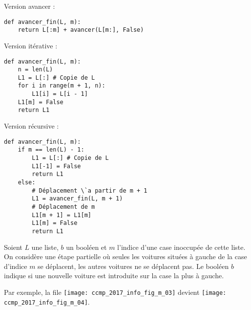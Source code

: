 \ifprof
\begin{corrige}
Version avancer :
\begin{lstlisting}
def avancer_fin(L, m):
    return L[:m] + avancer(L[m:], False)
\end{lstlisting}


Version itérative :
\begin{lstlisting}
def avancer_fin(L, m):
    n = len(L)
    L1 = L[:] # Copie de L
    for i in range(m + 1, n):
        L1[i] = L[i - 1]
    L1[m] = False
    return L1
\end{lstlisting}


Version récursive :
\begin{lstlisting}
def avancer_fin(L, m):
    if m == len(L) - 1:
        L1 = L[:] # Copie de L
        L1[-1] = False
        return L1
    else:
        # Déplacement \`a partir de m + 1
        L1 = avancer_fin(L, m + 1) 
        # Déplacement de m
        L1[m + 1] = L1[m]          
        L1[m] = False
        return L1
\end{lstlisting}
\end{corrige}
\else
\fi

Soient $L$ une liste, $b$ un booléen et $m$ l'indice d'une case inoccupée de cette liste.
On considère une étape partielle où seules les voitures situées à gauche de la case d'indice $m$ se
déplacent, les autres voitures ne se déplacent pas. Le booléen $b$ indique si une nouvelle voiture est
introduite sur la case la plus à gauche.


Par exemple, la file \texttt{[image: ccmp\_2017\_info\_fig\_m\_03]}
 devient \texttt{[image: ccmp\_2017\_info\_fig\_m\_04]}.


